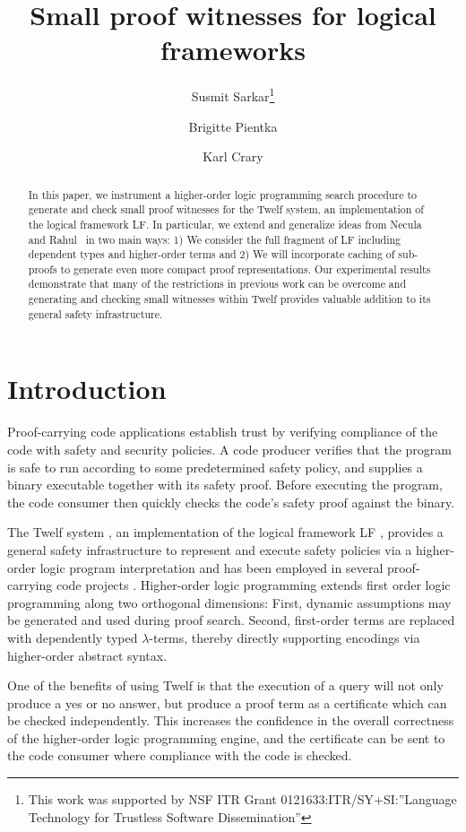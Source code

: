 \documentclass{llncs}
\title{Small proof witnesses for logical frameworks}
\author{
Susmit Sarkar\inst{1}\thanks{This work was supported by NSF ITR Grant 0121633:ITR/SY+SI:''Language Technology for Trustless Software Dissemination''}
\and Brigitte Pientka\inst{2}
\and Karl Crary\inst{1}}%
\institute{%
Carnegie Mellon University, Pittsburgh, USA
\and McGill University, Montr\'eal, Canada
}
\date{}
\begin{document}
\maketitle 

\begin{abstract}
In this paper, we instrument a higher-order logic programming
search procedure to generate and check small proof witnesses for
the Twelf system, an implementation of the logical framework LF. In
particular, we extend and generalize ideas from Necula and
Rahul~\cite{Necula+01:oracle} in two main ways: 1) We consider the 
full fragment of LF including dependent types and higher-order terms
and 2) We will incorporate caching of sub-proofs to generate even more
compact proof representations. Our experimental results  demonstrate
that many of the restrictions in previous work can be overcome and
generating and checking small witnesses within Twelf provides valuable
addition to its general safety infrastructure.
\end{abstract}

\section{Introduction}
Proof-carrying code applications establish trust by verifying
compliance of the code with safety and security policies.
A code producer verifies that the program is safe to
run according to some predetermined safety policy, and supplies a
binary executable together with its safety proof. Before
executing the program, the code consumer then quickly checks the code's
safety proof against the binary. 

The Twelf system \cite{Pfenning99cade}, an implementation of the logical framework LF \cite{Harper93jacm}, provides a general safety
infrastructure to represent and execute safety policies via a
higher-order logic program interpretation and has been employed in
several proof-carrying code projects
\cite{AppelFelty00,Crary:POPL03,AppelFelten99,Crary:CADE03}.   
Higher-order logic programming extends first order logic
programming along two orthogonal dimensions: First, dynamic assumptions
may be generated and used during proof search. Second, first-order terms
are replaced with dependently typed $\lambda$-terms, thereby
directly supporting encodings via higher-order abstract
syntax. 

One of the benefits of using Twelf is that the
execution of a query will not only produce a yes or no answer, but
produce a proof term as a certificate which can be checked independently. 
This increases the confidence in the overall correctness of the
higher-order logic programming engine, and the certificate can
be sent to the code consumer where compliance with the code is
checked. 
\end{document}
